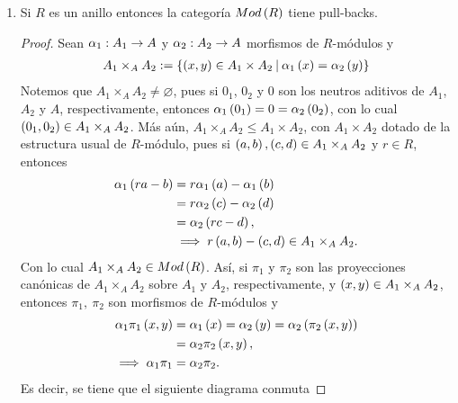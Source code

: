 \documentclass{article}
\begin{document}
\begin{enumerate}[label=\textbf{Ej \arabic*.}]
\begin{proof}
		 Bajo estas condiciones de la propiedad universal del push-out se obtiene el siguiente diagrama conmutativo
		\begin{equation*}
			\commutativesquare{up=t,pp=l,P=A_2,A=P,B=A_2,C=A_1,D=A,f=\beta_2,g=\beta_1,h=\alpha_2,k=\alpha_1,l=1_{A_2},m=\delta,n=\exists !\ \gamma,},
		\end{equation*}
		del cual se sigue en partícular que $\gamma\beta_2=1_{A_2}$.
	\end{proof}
		\item Si $R$ es un anillo entonces la categoría $Mod\left(R\right)$ tiene pull-backs.
		\begin{proof}
			Sean $\catarrow{\alpha_1}{A_1}{A}{}$ y $\catarrow{\alpha_2}{A_2}{A}{}$ morfismos de $R$-módulos y
			\begin{align*}
				A_1\times_{A} A_2:=\descset{\lrprth{x,y}}{A_1\times A_2}{\alpha_1\lrprth{x}=\alpha_2\lrprth{y}}
			\end{align*}
			\renewcommand{\copyandpaste}{A_1\times_{A} A_2}
			Notemos que $\copyandpaste\neq\varnothing$, pues si $0_1$, $0_2$ y $0$ son los neutros aditivos de $A_1$, $A_2$ y $A$, respectivamente, entonces $\alpha_1\left(0_1\right)=0=\alpha_2\left(0_2\right)$, con lo cual $\lrprth{0_1,0_2}\in\copyandpaste$. Más aún, $\copyandpaste\leq A_1\times A_2$, con $A_1\times A_2$ dotado de la estructura usual de $R$-módulo, pues si $\lrprth{a,b},\lrprth{c,d}\in\copyandpaste$ y $r\in R$, entonces
			\begin{align*}
				\alpha_1\lrprth{ra-b}&=r\alpha_1\lrprth{a}-\alpha_1\lrprth{b}\\
				&=r\alpha_2\lrprth{c}-\alpha_2\lrprth{d}\\
				&=\alpha_2\lrprth{rc-d},\\
				&\implies r\lrprth{a,b}-\lrprth{c,d}\in\copyandpaste.
			\end{align*}
			Con lo cual $\copyandpaste\in Mod\lrprth{R}$. Así, si $\pi_1$ y $\pi_2$ son las proyecciones canónicas de $\copyandpaste$ sobre $A_1$ y $A_2$, respectivamente, y $\lrprth{x,y}\in\copyandpaste$, entonces $\pi_1,\ \pi_2$ son morfismos de $R$-módulos y 
			\begin{align*}
				\alpha_1\pi_1\left(x,y\right)&=\alpha_1\left(x\right)=\alpha_2\left(y\right)=\alpha_2\left(\pi_2\left(x,y\right)\right)\\
				&=\alpha_2\pi_2\left(x,y\right),\\
				\implies \alpha_1\pi_1&=\alpha_2\pi_2.
			\end{align*}
			Es decir, se tiene que el siguiente diagrama conmuta

\end{proof}
\end{enumerate}
\end{document}
